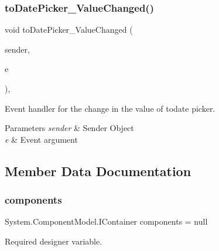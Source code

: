 \subsubsection{\texorpdfstring{to\+Date\+Picker\+\_\+\+Value\+Changed()}{toDatePicker\_ValueChanged()}}
{\footnotesize\ttfamily void to\+Date\+Picker\+\_\+\+Value\+Changed (\begin{DoxyParamCaption}\item[{object}]{sender,  }\item[{Event\+Args}]{e }\end{DoxyParamCaption})\hspace{0.3cm}{\ttfamily [inline]}, {\ttfamily [private]}}



Event handler for the change in the value of todate picker. 


\begin{DoxyParams}{Parameters}
{\em sender} & Sender Object\\
\hline
{\em e} & Event argument\\
\hline
\end{DoxyParams}


\subsection{Member Data Documentation}
\mbox{\label{classWildlifeTrackingApp_1_1Report_a02595f1c09713bb71dcb2fbbfc7ffa4b}} 
\subsubsection{\texorpdfstring{components}{components}}
{\footnotesize\ttfamily System.\+Component\+Model.\+I\+Container components = null\hspace{0.3cm}{\ttfamily [private]}}



Required designer variable. 

\mbox{\label{classWildlifeTrackingApp_1_1Report_a3ee65fd5edda8ee4040edc92e50acfc5}} 
